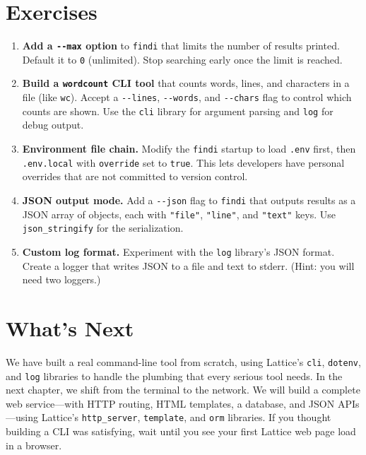 \section*{Exercises}\label{sec:cli-exercises}

\begin{enumerate}
  \item \textbf{Add a \texttt{-{}-max} option} to \texttt{findi} that limits the number of results printed.
  Default it to \lstinline|0| (unlimited).
  Stop searching early once the limit is reached.

  \item \textbf{Build a \texttt{wordcount} CLI tool} that counts words, lines, and characters in a file (like \texttt{wc}).
  Accept a \texttt{-{}-lines}, \texttt{-{}-words}, and \texttt{-{}-chars} flag to control which counts are shown.
  Use the \lstinline|cli| library for argument parsing and \lstinline|log| for debug output.

  \item \textbf{Environment file chain.} Modify the \texttt{findi} startup to load \texttt{.env} first, then \texttt{.env.local} with \lstinline|override| set to \lstinline|true|.
  This lets developers have personal overrides that are not committed to version control.

  \item \textbf{JSON output mode.} Add a \texttt{-{}-json} flag to \texttt{findi} that outputs results as a JSON array of objects, each with \lstinline|"file"|, \lstinline|"line"|, and \lstinline|"text"| keys.
  Use \lstinline|json_stringify| for the serialization.

  \item \textbf{Custom log format.} Experiment with the \lstinline|log| library's JSON format.
  Create a logger that writes JSON to a file and text to stderr.
  (Hint: you will need two loggers.)
\end{enumerate}

\section*{What's Next}\label{sec:cli-whats-next}

We have built a real command-line tool from scratch, using Lattice's \lstinline|cli|, \lstinline|dotenv|, and \lstinline|log| libraries to handle the plumbing that every serious tool needs.
In the next chapter, we shift from the terminal to the network.
We will build a complete web service---with HTTP routing, HTML templates, a database, and JSON APIs---using Lattice's \lstinline|http_server|, \lstinline|template|, and \lstinline|orm| libraries.
If you thought building a CLI was satisfying, wait until you see your first Lattice web page load in a browser.
